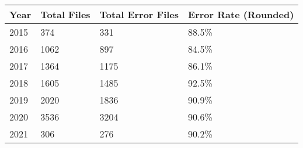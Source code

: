 \begin{tabular}{llll}
\toprule
Year & Total Files & Total Error Files & Error Rate (Rounded) \\
\midrule
2015 &         374 &               331 &                88.5\% \\ \hline
2016 &        1062 &               897 &                84.5\% \\ \hline
2017 &        1364 &              1175 &                86.1\% \\ \hline
2018 &        1605 &              1485 &                92.5\% \\ \hline
2019 &        2020 &              1836 &                90.9\% \\ \hline
2020 &        3536 &              3204 &                90.6\% \\ \hline
2021 &         306 &               276 &                90.2\% \\
\bottomrule
\end{tabular}
